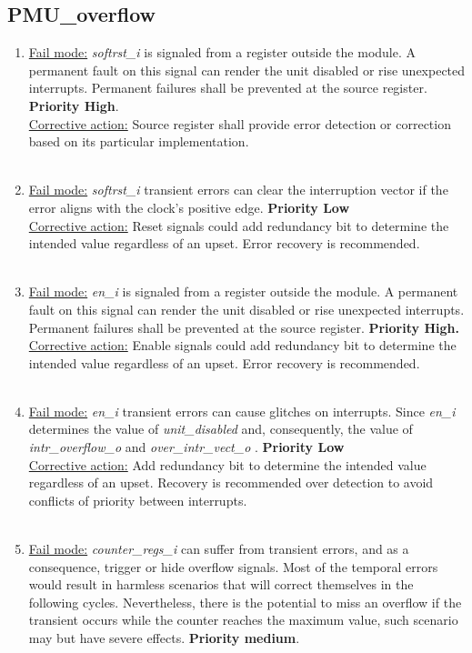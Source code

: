 \subsection{PMU\_overflow}
\begin{enumerate}

\item \underline{Fail mode:} \textit{softrst\_i} is signaled from a register outside the module. A permanent fault on this signal can render the unit disabled or rise unexpected interrupts. Permanent failures shall be prevented at the source register. \textbf{Priority High}.\\
\underline{Corrective action:} Source register shall provide error detection or correction based on its particular implementation.\\
\\
\item \underline{Fail mode:} \textit{softrst\_i} transient errors can clear the interruption vector if the error aligns with the clock's positive edge. \textbf{Priority Low}\\
\underline{Corrective action:} Reset signals could add redundancy bit to determine the intended value regardless of an upset.  Error recovery is recommended.\\
\\
\item \underline{Fail mode:} \textit{en\_i }is signaled from a register outside the module. A permanent fault on this signal can render the unit disabled or rise unexpected interrupts. Permanent failures shall be prevented at the source register. \textbf{Priority High.}\\
\underline{Corrective action:} Enable signals could add redundancy bit to determine the intended value regardless of an upset. Error recovery is recommended.\\
\\
\item \underline{Fail mode:} \textit{en\_i} transient errors can cause glitches on interrupts. Since\textit{ en\_i} determines the value of \textit{unit\_disabled} and, consequently, the value of \textit{intr\_overflow\_o} and \textit{over\_intr\_vect\_o} . \textbf{Priority Low}\\
\underline{Corrective action:} Add redundancy bit to determine the intended value regardless of an upset. Recovery is recommended over detection to avoid conflicts of priority between interrupts.\\
\\
\item \underline{Fail mode:} \textit{counter\_regs\_i} can suffer from transient errors, and as a consequence, trigger or hide overflow signals. Most of the temporal errors would result in harmless scenarios that will correct themselves in the following cycles. Nevertheless, there is the potential to miss an overflow if the transient occurs while the counter reaches the maximum value, such scenario may but have severe effects. \textbf{Priority medium}.\\

\end{enumerate}
